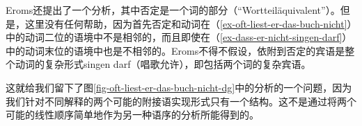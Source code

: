 Eroms还提出了一个分析，其中否定是一个词的部分（``Wortteiläquivalent''）。但是，这里没有任何帮助，因为首先否定和动词在（\ref{ex-oft-liest-er-das-buch-nicht}）中的动词二位的语境中不是相邻的，而且即使在（\ref{ex-dass-er-nicht-singen-darf}）中的动词末位的语境中也是不相邻的。Eroms不得不假设，依附到否定的宾语是整个动词的复杂形式singen darf（唱歌允许），即包括两个词的复杂宾语。

这就给我们留下了图\ref{fig-oft-liest-er-das-buch-nicht-dg}中的分析的一个问题，因为我们针对不同解释的两个可能的附接语实现形式只有一个结构。这不是通过将两个可能的线性顺序简单地作为另一种语序的分析所能得到的。

